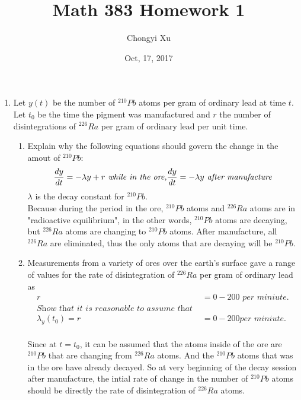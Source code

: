 \documentclass{article}
\title{}
\title{Math 383 Homework 1}
\author{Chongyi Xu}
\date{Oct, 17, 2017}
\begin{document}
	\maketitle
	\begin{enumerate}
	\item Let $y(t)$ be the number of $^{210}Pb$ atoms per gram of ordinary lead at time $t$. Let $t_0$ be the time the 
	pigment was manufactured and $r$ the number of disintegrations of $^{226}Ra$ per gram of ordinary lead per unit time.
	\begin{enumerate}
		\item Explain why the following equations should govern the change in the amout of $^{210}Pb:$
		\begin{equation*}
			\frac{dy}{dt} = -\lambda y + r \textit{ while in the ore,}\\
			\frac{dy}{dt} = -\lambda y \textit{ after manufacture}
		\end{equation*}
		$\lambda$ is the decay constant for $^{210}Pb$.
		\\ Because during the period in the ore,  $^{210}Pb$ atoms and $^{226}Ra$ atoms are in "radioactive equilibrium", in the other words, $^{210}Pb$ atoms are decaying, but $^{226}Ra$ atoms are changing to $^{210}Pb$ atoms. After manufacture, all $^{226}Ra$ are eliminated, thus the only atoms that are decaying will be $^{210}Pb$.
	
		\item Measurements from a variety of ores over the earth's surface gave a range of values for the rate of disintegration of $^{226}Ra$ per gram of ordinary lead as
		\begin{align*}
			r &= 0 - 200 \textit{ per miniute}. \\
			\textit{Show that it is reasonable to assume that }\\
			\lambda_y(t_0) = r &= 0 - 200 \textit{per miniute}.
		\end{align*}
		\\ Since at $t = t_0$, it can be assumed that the atoms inside of the ore are $^{210}Pb$ that are changing from $^{226}Ra$ atoms. And the $^{210}Pb$ atoms that was in the ore have already decayed. So at very beginning of the decay session after manufacture, the intial rate of change in the number of $^{210}Pb$ atoms should be directly the rate of disintegration of $^{226}Ra$ atoms.
	

\end{enumerate}
\end{enumerate}
\end{document}
